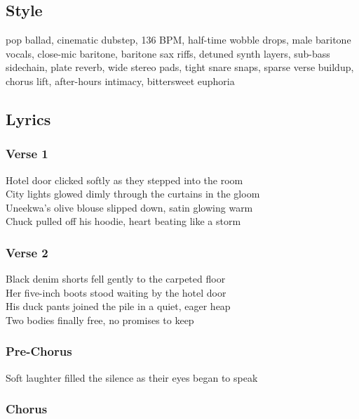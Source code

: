 \subsection{Style}\label{style-40}

pop ballad, cinematic dubstep, 136 BPM, half-time wobble drops, male
baritone vocals, close-mic baritone, baritone sax riffs, detuned synth
layers, sub-bass sidechain, plate reverb, wide stereo pads, tight snare
snaps, sparse verse buildup, chorus lift, after-hours intimacy,
bittersweet euphoria

\subsection{Lyrics}\label{lyrics-40}

\subsubsection{Verse 1}\label{verse-1-23}

Hotel door clicked softly as they stepped into the room\\
City lights glowed dimly through the curtains in the gloom\\
Uneekwa's olive blouse slipped down, satin glowing warm\\
Chuck pulled off his hoodie, heart beating like a storm

\subsubsection{Verse 2}\label{verse-2-24}

Black denim shorts fell gently to the carpeted floor\\
Her five-inch boots stood waiting by the hotel door\\
His duck pants joined the pile in a quiet, eager heap\\
Two bodies finally free, no promises to keep

\subsubsection{Pre-Chorus}\label{pre-chorus-28}

Soft laughter filled the silence as their eyes began to speak

\subsubsection{Chorus}\label{chorus-53}

